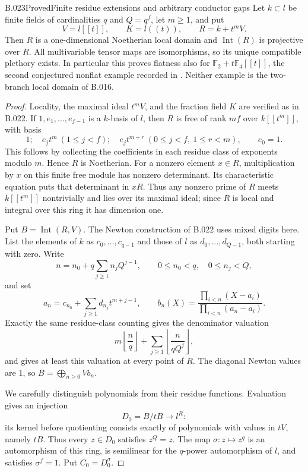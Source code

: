 \begin{saresult}{B.023}{Proved}{Finite residue extensions and arbitrary conductor gaps}
Let $k\subset l$ be finite fields of cardinalities $q$ and
$Q=q^f$, let $m\ge1$, and put
\[
 V=l[[t]],\qquad K=l((t)),\qquad R=k+t^mV.
\]
Then $R$ is a one-dimensional Noetherian local domain and
$\operatorname{Int}(R)$ is projective over $R$. All multivariable
tensor maps are isomorphisms, so its unique compatible plethory
exists. In particular this proves flatness also for
$\mathbb F_2+t\mathbb F_4[[t]]$, the second conjectured nonflat
example recorded in \cite[introduction, p.2]{ElliottPresentations2011}.
Neither example is the two-branch local domain of B.016.
\end{saresult}
\begin{proof}
Locality, the maximal ideal $t^mV$, and the fraction field $K$
are verified as in B.022. If $1,e_1,\ldots,e_{f-1}$ is a
$k$-basis of $l$, then $R$ is free of rank $mf$ over $k[[t^m]]$,
with basis
\[
 1;\quad e_jt^m\ (1\le j<f);\quad
 e_jt^{m+r}\ (0\le j<f,\ 1\le r<m),\qquad e_0=1.
\]
This follows by collecting the coefficients in each residue class
of exponents modulo $m$. Hence $R$ is Noetherian. For a nonzero
element $x\in R$, multiplication by $x$ on this finite free module
has nonzero determinant. Its characteristic equation puts that
determinant in $xR$. Thus any nonzero prime of $R$ meets
$k[[t^m]]$ nontrivially and lies over its maximal ideal; since $R$
is local and integral over this ring it has dimension one.

Put $B=\operatorname{Int}(R,V)$. The Newton construction of B.022
uses mixed digits here. List the elements of $k$ as $c_0,\ldots,c_{q-1}$
and those of $l$ as $d_0,\ldots,d_{Q-1}$, both starting with zero.
Write
\[
 n=n_0+q\sum_{j\ge1}n_jQ^{j-1},\qquad
 0\le n_0<q,\quad 0\le n_j<Q,
\]
and set
\[
 a_n=c_{n_0}+\sum_{j\ge1}d_{n_j}t^{m+j-1},\qquad
 b_n(X)=\frac{\prod_{i<n}(X-a_i)}{\prod_{i<n}(a_n-a_i)}.
\]
Exactly the same residue-class counting gives the denominator
valuation
\[
 m\left\lfloor\frac nq\right\rfloor+
 \sum_{j\ge1}\left\lfloor\frac n{qQ^j}\right\rfloor,
\]
and gives at least this valuation at every point of $R$.
The diagonal Newton values are $1$, so
$B=\bigoplus_{n\ge0}Vb_n$.

We carefully distinguish polynomials from their residue functions.
Evaluation gives an injection
\[
 D_0=B/tB\longrightarrow l^R:
\]
its kernel before quotienting consists exactly of polynomials with
values in $tV$, namely $tB$. Thus every $z\in D_0$ satisfies
$z^Q=z$. The map $\sigma:z\mapsto z^q$ is an automorphism of
this ring, is semilinear for the $q$-power automorphism of $l$,
and satisfies $\sigma^f=1$. Put $C_0=D_0^\sigma$.


\end{proof}
